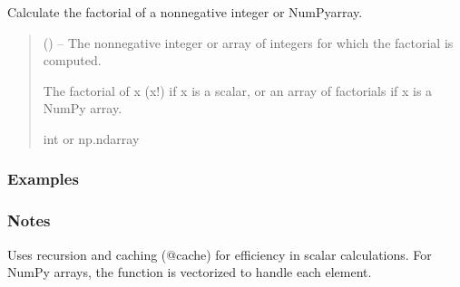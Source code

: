 \documentclass[a4paper,10pt,oneside,english]{sphinxmanual}
\begin{document}
\begin{fulllineitems}
\label{\detokenize{acsefunctions:acsefunctions.functions.fact}}
\pysigstartsignatures
\pysiglinewithargsret
{}
{}
{}
\pysigstopsignatures
\sphinxAtStartPar
Calculate the factorial of a non\sphinxhyphen{}negative integer or NumPyarray.
\begin{quote}\begin{description}
\sphinxAtStartPar
{} () – The non\sphinxhyphen{}negative integer or array of integers for which the factorial
is computed.

\sphinxAtStartPar
The factorial of x (x!) if x is a scalar, or an array of factorials
if x is a NumPy array.

\sphinxAtStartPar
int or np.ndarray

\end{description}\end{quote}
\subsubsection*{Examples}

\begin{sphinxVerbatim}[commandchars=\\\{\}]
\end{sphinxVerbatim}

\begin{sphinxVerbatim}[commandchars=\\\{\}]
\PYG{p}{[}    \PYG{p}{]}
\end{sphinxVerbatim}
\subsubsection*{Notes}

\sphinxAtStartPar
Uses recursion and caching (@cache) for efficiency in scalar calculations.
For NumPy arrays, the function is vectorized to handle each element.

\end{fulllineitems}
\end{document}
